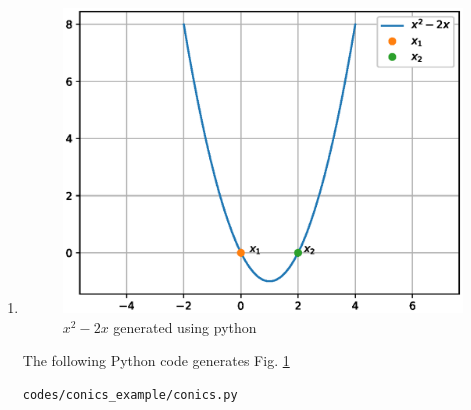 \begin{enumerate}[label=\thesubsection.\arabic*.,ref=\thesubsection.\theenumi]
\newpage

\item \begin{figure}[!ht]
\centering
\includegraphics[width=\columnwidth]{./figs/conics_example/quadratic_equation.eps}
\caption{$x^2 -2x$ generated using python}
\label{fig:quadeq_conics_example}
\end{figure} 
The  following Python code generates Fig. \ref{fig:quadeq_conics_example}

\begin{lstlisting}
codes/conics_example/conics.py
\end{lstlisting}
\end{enumerate}